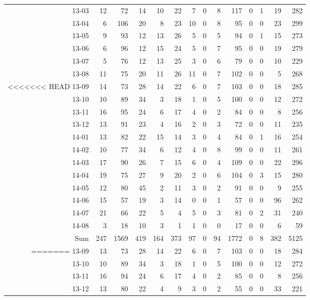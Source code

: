 \documentclass[presentation,xcolor=pdftex,dvipsnames,table]{beamer}
\begin{document}
\begin{frame}
\begin{tiny}
\begin{table}[ht]
\begin{tabular}{rrrrrrrrrrrrrr}
  13-03 & 12 & 72 & 14 & 10 & 22 & 7 & 0 & 8 & 117 & 0 & 1 & 19 & 282 \\ 
  13-04 & 6 & 106 & 20 & 8 & 23 & 10 & 0 & 8 & 95 & 0 & 0 & 23 & 299 \\ 
  13-05 & 9 & 93 & 12 & 13 & 26 & 5 & 0 & 5 & 94 & 0 & 1 & 15 & 273 \\ 
  13-06 & 6 & 96 & 12 & 15 & 24 & 5 & 0 & 7 & 95 & 0 & 0 & 19 & 279 \\ 
  13-07 & 5 & 76 & 12 & 13 & 25 & 3 & 0 & 6 & 79 & 0 & 0 & 10 & 229 \\ 
  13-08 & 11 & 75 & 20 & 11 & 26 & 11 & 0 & 7 & 102 & 0 & 0 & 5 & 268 \\ 
<<<<<<< HEAD
  13-09 & 14 & 73 & 28 & 14 & 22 & 6 & 0 & 7 & 103 & 0 & 0 & 18 & 285 \\ 
  13-10 & 10 & 89 & 34 & 3 & 18 & 1 & 0 & 5 & 100 & 0 & 0 & 12 & 272 \\ 
  13-11 & 16 & 95 & 24 & 6 & 17 & 4 & 0 & 2 & 84 & 0 & 0 & 8 & 256 \\ 
  13-12 & 13 & 91 & 23 & 4 & 16 & 2 & 0 & 3 & 72 & 0 & 0 & 11 & 235 \\ 
  14-01 & 13 & 82 & 22 & 15 & 14 & 3 & 0 & 4 & 84 & 0 & 1 & 16 & 254 \\ 
  14-02 & 10 & 77 & 34 & 6 & 12 & 4 & 0 & 8 & 99 & 0 & 0 & 11 & 261 \\ 
  14-03 & 17 & 90 & 26 & 7 & 15 & 6 & 0 & 4 & 109 & 0 & 0 & 22 & 296 \\ 
  14-04 & 19 & 75 & 27 & 9 & 20 & 2 & 0 & 6 & 104 & 0 & 3 & 15 & 280 \\ 
  14-05 & 12 & 80 & 45 & 2 & 11 & 3 & 0 & 2 & 91 & 0 & 0 & 9 & 255 \\ 
  14-06 & 15 & 57 & 19 & 3 & 14 & 0 & 0 & 1 & 57 & 0 & 0 & 96 & 262 \\ 
  14-07 & 21 & 66 & 22 & 5 & 4 & 5 & 0 & 3 & 81 & 0 & 2 & 31 & 240 \\ 
  14-08 & 3 & 18 & 10 & 3 & 1 & 1 & 0 & 0 & 17 & 0 & 0 & 6 & 59 \\ 
  Sum & 247 & 1569 & 419 & 164 & 373 & 97 & 0 & 94 & 1772 & 0 & 8 & 382 & 5125 \\ 
=======
  13-09 & 13 & 73 & 28 & 14 & 22 & 6 & 0 & 7 & 103 & 0 & 0 & 18 & 284 \\ 
  13-10 & 10 & 89 & 34 & 3 & 18 & 1 & 0 & 5 & 100 & 0 & 0 & 12 & 272 \\ 
  13-11 & 16 & 94 & 24 & 6 & 17 & 4 & 0 & 2 & 85 & 0 & 0 & 8 & 256 \\ 
  13-12 & 13 & 80 & 22 & 4 & 9 & 3 & 0 & 2 & 55 & 0 & 0 & 33 & 221 \\ 

\end{tabular}
\end{table}
\end{tiny}
\end{frame}
\end{document}
